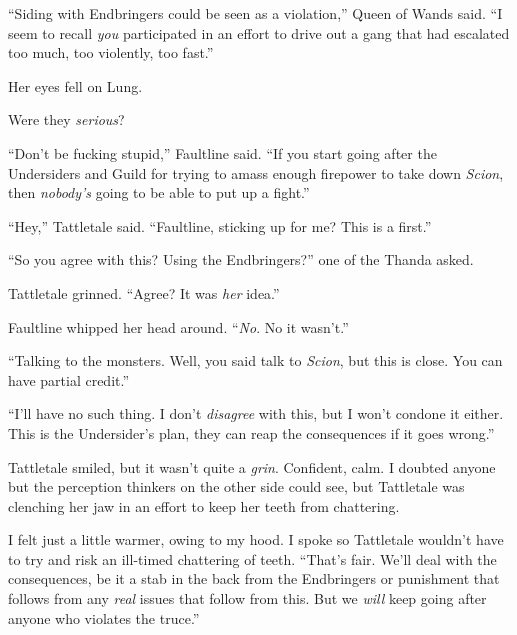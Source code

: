 ``Siding with Endbringers could be seen as a violation,'' Queen of Wands said.  ``I seem to recall \emph{you} participated in an effort to drive out a gang that had escalated too much, too violently, too fast.''



Her eyes fell on Lung.



Were they \emph{serious}?



``Don't be fucking stupid,'' Faultline said.  ``If you start going after the Undersiders and Guild for trying to amass enough firepower to take down \emph{Scion}, then \emph{nobody's }going to be able to put up a fight.''



``Hey,'' Tattletale said.  ``Faultline, sticking up for me?  This is a first.''



``So you agree with this?  Using the Endbringers?''  one of the Thanda asked.



Tattletale grinned.  ``Agree?  It was \emph{her} idea.''



Faultline whipped her head around.  ``\emph{No}.  No it wasn't.''



``Talking to the monsters.  Well, you said talk to \emph{Scion}, but this is close.  You can have partial credit.''



``I'll have no such thing.  I don't \emph{disagree} with this, but I won't condone it either.  This is the Undersider's plan, they can reap the consequences if it goes wrong.''



Tattletale smiled, but it wasn't quite a \emph{grin}.  Confident, calm.  I doubted anyone but the perception thinkers on the other side could see, but Tattletale was clenching her jaw in an effort to keep her teeth from chattering.



I felt just a little warmer, owing to my hood.  I spoke so Tattletale wouldn't have to try and risk an ill-timed chattering of teeth.  ``That's fair.  We'll deal with the consequences, be it a stab in the back from the Endbringers or punishment that follows from any \emph{real} issues that follow from this.  But we \emph{will} keep going after anyone who violates the truce.''



